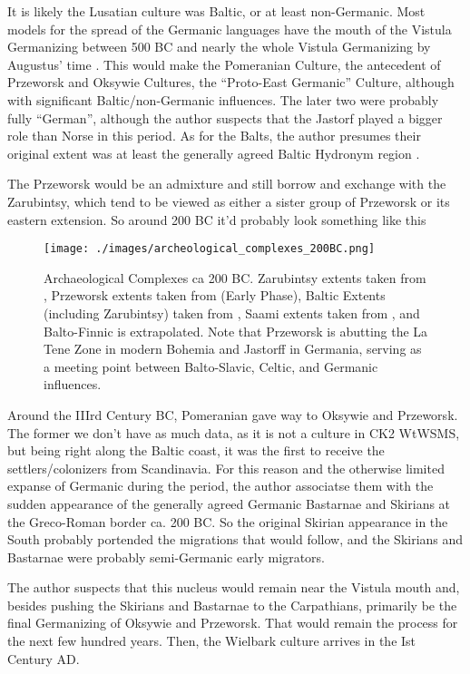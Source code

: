 \documentclass{article}
\begin{document}
	It is likely the Lusatian culture was Baltic, or at least non-Germanic.
	Most models for the spread of the Germanic languages have the mouth of the Vistula Germanizing between 500 BC and nearly the whole Vistula Germanizing by Augustus’ time \cite{HeatherEmpiresAndBarbarians}.
	This would make the Pomeranian Culture, the antecedent of Przeworsk and Oksywie Cultures, the “Proto-East Germanic” Culture, although with significant Baltic/non-Germanic influences.
	The later two were probably fully “German”, although the author suspects that the Jastorf played a bigger role than Norse in this period.
	As for the Balts, the author presumes their original extent was at least the generally agreed Baltic Hydronym region \cite{HeatherEmpiresAndBarbarians,BalticHydronyms}.
	
	The Przeworsk would be an admixture and still borrow and exchange with the Zarubintsy, which tend to be viewed as either a sister group of Przeworsk or its eastern extension. So around 200 BC it’d probably look something like this
	
	\begin{figure}[h!]
		\centering
		\texttt{[image: ./images/archeological\_complexes\_200BC.png]}
		\caption{Archaeological Complexes ca 200 BC.
			\tiny Zarubintsy extents taken from \cite{IndoEuroEncyclopedia}, Przeworsk extents taken from \cite{PrzeworskHistory} (Early Phase), Baltic Extents (including Zarubintsy) taken from \cite{BalticHydronyms}, Saami extents taken from \cite{LaplandSaami}, and Balto-Finnic is extrapolated.
			Note that Przeworsk is abutting the La Tene Zone in modern Bohemia and Jastorff in Germania, serving as a meeting point between Balto-Slavic, Celtic, and Germanic influences.}
	\end{figure}
	
	Around the IIIrd Century BC, Pomeranian gave way to Oksywie and Przeworsk.
	The former we don’t have as much data, as it is not a culture in CK2 WtWSMS, but being right along the Baltic coast, it was the first to receive the settlers/colonizers from Scandinavia.
	For this reason and the otherwise limited expanse of Germanic during the period, the author associatse them with the sudden appearance of the generally agreed Germanic Bastarnae and Skirians at the Greco-Roman border ca. 200 BC.
	So the original Skirian appearance in the South probably portended the migrations that would follow, and the Skirians and Bastarnae were probably semi-Germanic early migrators.
	
	The author suspects that this nucleus would remain near the Vistula mouth and, besides pushing the Skirians and Bastarnae to the Carpathians, primarily be the final Germanizing of Oksywie and Przeworsk.
	That would remain the process for the next few hundred years.
	Then, the Wielbark culture arrives in the Ist Century AD.
	
\end{document}
